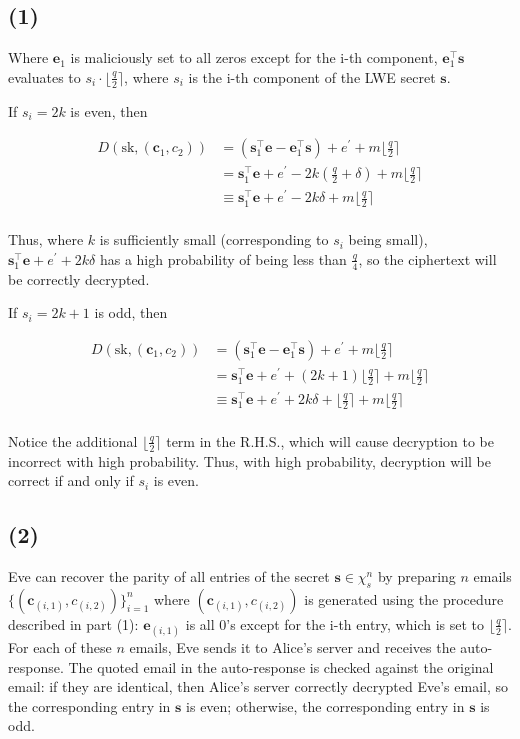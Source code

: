 \documentclass{article}
\newcommand{\round}[1]{\lfloor {#1} \rceil}
\begin{document}
\subsection*{(1)}
Where $\mathbf{e}_1$ is maliciously set to all zeros except for the i-th component, $\mathbf{e}_1^\intercal \mathbf{s}$ evaluates to $s_i \cdot \round{\frac{q}{2}}$, where $s_i$ is the i-th component of the LWE secret $\mathbf{s}$.

If $s_i = 2k$ is even, then

$$
\begin{aligned}
D(\text{sk}, (\mathbf{c}_1, c_2)) 
&= (\mathbf{s}_1^\intercal\mathbf{e} - \mathbf{e}_1^\intercal\mathbf{s}) + e^\prime + m\round{\frac{q}{2}} \\
&= \mathbf{s}_1^\intercal\mathbf{e} + e^\prime - 2k(\frac{q}{2} + \delta) + m\round{\frac{q}{2}} \\
&\equiv  \mathbf{s}_1^\intercal\mathbf{e} + e^\prime - 2k\delta + m\round{\frac{q}{2}} \\
\end{aligned}
$$

Thus, where $k$ is sufficiently small (corresponding to $s_i$ being small), $\mathbf{s}_1^\intercal\mathbf{e} + e^\prime + 2k\delta$ has a high probability of being less than $\frac{q}{4}$, so the ciphertext will be correctly decrypted.

If $s_i = 2k + 1$ is odd, then

$$
\begin{aligned}
D(\text{sk}, (\mathbf{c}_1, c_2)) 
&= (\mathbf{s}_1^\intercal\mathbf{e} - \mathbf{e}_1^\intercal\mathbf{s}) + e^\prime + m\round{\frac{q}{2}} \\
&= \mathbf{s}_1^\intercal\mathbf{e} + e^\prime + (2k + 1)\round{\frac{q}{2}} + m\round{\frac{q}{2}} \\
&\equiv  \mathbf{s}_1^\intercal\mathbf{e} + e^\prime + 2k\delta + \round{\frac{q}{2}} + m\round{\frac{q}{2}} \\
\end{aligned}
$$

Notice the additional $\round{\frac{q}{2}}$ term in the R.H.S., which will cause decryption to be incorrect with high probability. Thus, with high probability, decryption will be correct if and only if $s_i$ is even.

\subsection*{(2)}
Eve can recover the parity of all entries of the secret $\mathbf{s} \in \chi_s^n$ by preparing $n$ emails $\{(\mathbf{c}_{(i, 1)}, c_{(i, 2)})\}_{i=1}^{n}$ where $(\mathbf{c}_{(i, 1)}, c_{(i, 2)})$ is generated using the procedure described in part (1): $\mathbf{e}_{(i, 1)}$ is all 0's except for the i-th entry, which is set to $\round{\frac{q}{2}}$. For each of these $n$ emails, Eve sends it to Alice's server and receives the auto-response. The quoted email in the auto-response is checked against the original email: if they are identical, then Alice's server correctly decrypted Eve's email, so the corresponding entry in $\mathbf{s}$ is even; otherwise, the corresponding entry in $\mathbf{s}$ is odd.
\end{document}
